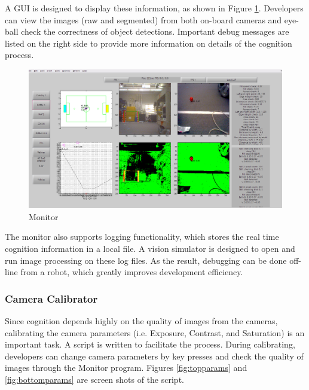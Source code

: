 \documentclass{article}
\begin{document}
	A GUI is designed to display these information, as shown in Figure \ref{fig:monitor}. Developers can view the images (raw and segmented) from both on-board cameras and eye-ball check the correctness of object detections. Important debug messages are listed on the right side to provide more information on details of the cognition process.

      \begin{figure}[H]
		\centering
    		\includegraphics[width=1.0\textwidth]{figures/Monitor.png}
		\caption{Monitor}
    		\label{fig:monitor}
	\end{figure}

	The monitor also supports logging functionality, which stores the real time cognition information in a local file.
A vision simulator is designed to open and run image processing on these log files. As the result, debugging can be done off-line from a robot, which greatly improves development efficiency.
 
\subsubsection{Camera Calibrator}
      Since cognition depends highly on the quality of images from the cameras, calibrating the camera parameters (i.e. Exposure, Contrast, and Saturation) is an important task. A script is written to facilitate the process. During calibrating, developers can change camera parameters by key presses and check the quality of images through the Monitor program. Figures \ref{fig:topparams} and \ref{fig:bottomparams} are screen shots of the script.
 	    
\end{document}
